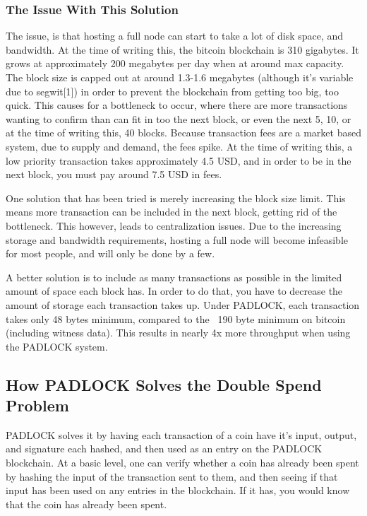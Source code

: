 \documentclass[12pt, letterpaper]{article}
\begin{document}
\subsubsection{The Issue With This Solution}
The issue, is that hosting a full node can start to take a lot of disk space,
and bandwidth. At the time of writing this, the bitcoin blockchain is 310
gigabytes. It grows at approximately 200 megabytes per day when at around max
capacity. The block size is capped out at around 1.3-1.6 megabytes (although
it's variable due to segwit[1]) in order to prevent the blockchain from getting too
big, too quick. This causes for a bottleneck to occur, where there are more
transactions wanting to confirm than can fit in too the next block, or even the next
5, 10, or at the time of writing this, 40 blocks. Because transaction fees are a
market based system, due to supply and demand, the fees spike. At the time of
writing this, a low priority transaction takes approximately 4.5 USD, and in
order to be in the next block, you must pay around 7.5 USD in fees.

One solution that has been tried is merely increasing the block size limit. This
means more transaction can be included in the next block, getting rid of the
bottleneck. This however, leads to centralization issues. Due to the increasing
storage and bandwidth requirements, hosting a full node will become infeasible
for most people, and will only be done by a few.

A better solution is to include as many transactions as possible in the limited
amount of space each block has. In order to do that, you have to decrease the
amount of storage each transaction takes up. Under PADLOCK, each transaction
takes only 48 bytes minimum, compared to the ~190 byte minimum on bitcoin
(including witness data). This results in nearly 4x more throughput when using
the PADLOCK system.

\subsection{How PADLOCK Solves the Double Spend Problem}
PADLOCK solves it by having each transaction of a coin have it's input, output,
and signature each hashed, and then used as an entry on the PADLOCK blockchain.
At a basic level, one can verify whether a coin has already been spent by
hashing the input of the transaction sent to them, and then seeing if that input
has been used on any entries in the blockchain. If it has, you would know that
the coin has already been spent.
\end{document}
